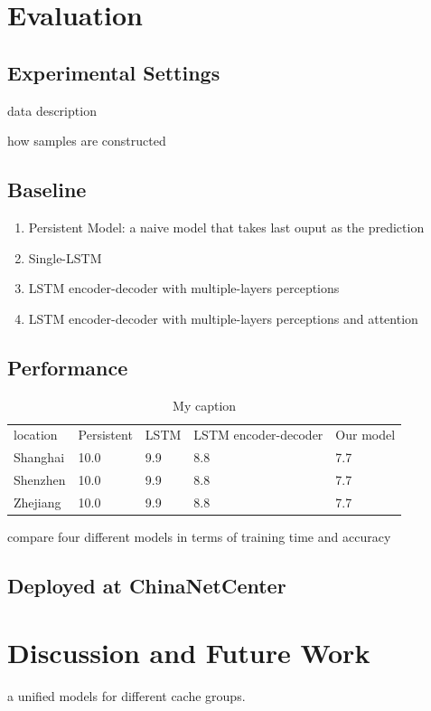 \documentclass[review]{elsarticle}
\begin{document}
\section{Evaluation}
\subsection{Experimental Settings}
data description

how samples are constructed

\subsection{Baseline}

\begin{enumerate}
  \item Persistent Model: a naive model that takes last ouput as the prediction
  \item Single-LSTM
  \item LSTM encoder-decoder with multiple-layers perceptions
  \item LSTM encoder-decoder with multiple-layers perceptions and attention
\end{enumerate}


\subsection{Performance}
\begin{table}[]
\centering
\caption{My caption}
\label{my-label}
\begin{tabular}{lllll}
location & Persistent & LSTM & LSTM encoder-decoder & Our model \\
Shanghai & 10.0       & 9.9  & 8.8                  & 7.7       \\
Shenzhen & 10.0       & 9.9  & 8.8                  & 7.7       \\
Zhejiang & 10.0       & 9.9  & 8.8                  & 7.7      
\end{tabular}
\end{table}



compare four different models in terms of training time and accuracy 
\subsection{Deployed at ChinaNetCenter}
\section{Discussion and Future Work}
a unified models for different cache groups.
\end{document}
